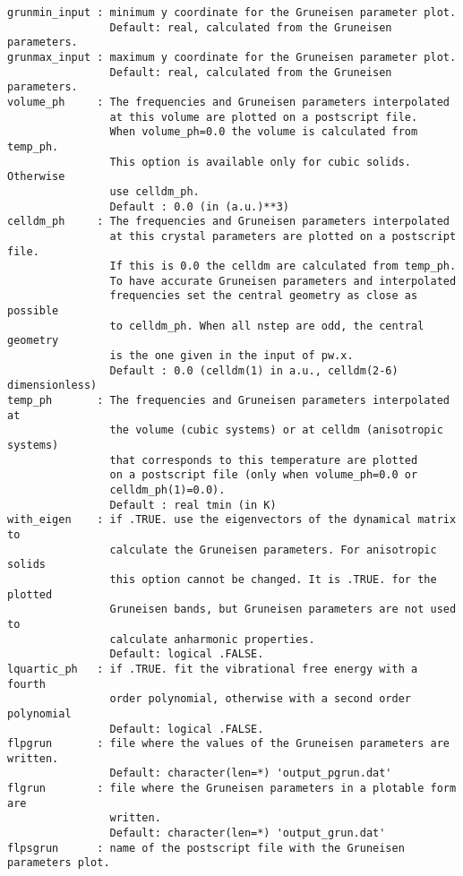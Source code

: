 \documentclass[12pt,a4paper]{article}
\begin{document}
\begin{verbatim}
grunmin_input : minimum y coordinate for the Gruneisen parameter plot.
                Default: real, calculated from the Gruneisen parameters.
grunmax_input : maximum y coordinate for the Gruneisen parameter plot.
                Default: real, calculated from the Gruneisen parameters.
volume_ph     : The frequencies and Gruneisen parameters interpolated 
                at this volume are plotted on a postscript file. 
                When volume_ph=0.0 the volume is calculated from temp_ph.
                This option is available only for cubic solids. Otherwise
                use celldm_ph.
                Default : 0.0 (in (a.u.)**3)
celldm_ph     : The frequencies and Gruneisen parameters interpolated 
                at this crystal parameters are plotted on a postscript file. 
                If this is 0.0 the celldm are calculated from temp_ph.
                To have accurate Gruneisen parameters and interpolated
                frequencies set the central geometry as close as possible 
                to celldm_ph. When all nstep are odd, the central geometry 
                is the one given in the input of pw.x.
                Default : 0.0 (celldm(1) in a.u., celldm(2-6) dimensionless)
temp_ph       : The frequencies and Gruneisen parameters interpolated at 
                the volume (cubic systems) or at celldm (anisotropic systems)
                that corresponds to this temperature are plotted 
                on a postscript file (only when volume_ph=0.0 or 
                celldm_ph(1)=0.0).
                Default : real tmin (in K)
with_eigen    : if .TRUE. use the eigenvectors of the dynamical matrix to
                calculate the Gruneisen parameters. For anisotropic solids
                this option cannot be changed. It is .TRUE. for the plotted
                Gruneisen bands, but Gruneisen parameters are not used to
                calculate anharmonic properties.
                Default: logical .FALSE. 
lquartic_ph   : if .TRUE. fit the vibrational free energy with a fourth
                order polynomial, otherwise with a second order polynomial
                Default: logical .FALSE.
flpgrun       : file where the values of the Gruneisen parameters are written. 
                Default: character(len=*) 'output_pgrun.dat'
flgrun        : file where the Gruneisen parameters in a plotable form are
                written.
                Default: character(len=*) 'output_grun.dat'
flpsgrun      : name of the postscript file with the Gruneisen parameters plot.

\end{verbatim}
\end{document}
